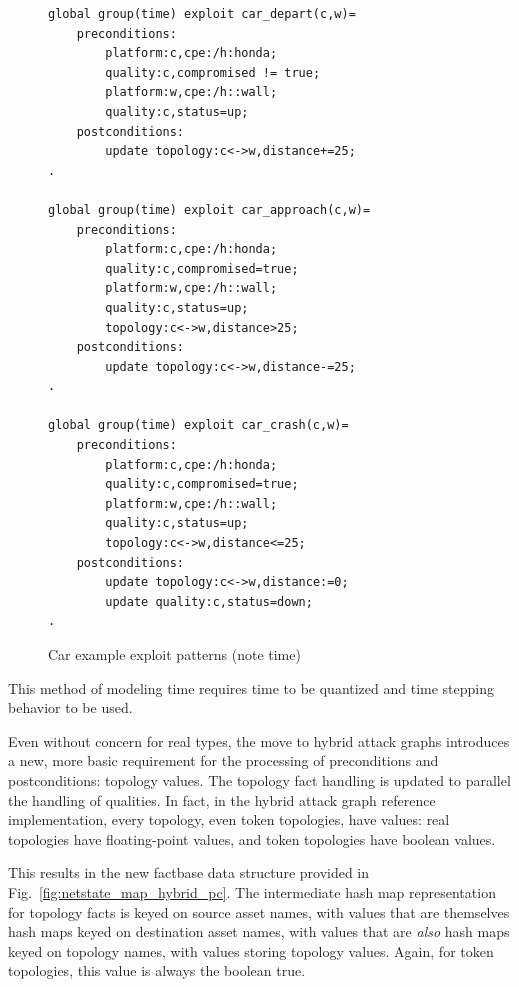 \begin{figure}
\begin{lstlisting}
global group(time) exploit car_depart(c,w)=
    preconditions:
        platform:c,cpe:/h:honda;
        quality:c,compromised != true;
        platform:w,cpe:/h::wall;
        quality:c,status=up;
    postconditions:
        update topology:c<->w,distance+=25;
.

global group(time) exploit car_approach(c,w)=
    preconditions:
        platform:c,cpe:/h:honda;
        quality:c,compromised=true;
        platform:w,cpe:/h::wall;
        quality:c,status=up;
        topology:c<->w,distance>25;
    postconditions:
        update topology:c<->w,distance-=25;
.

global group(time) exploit car_crash(c,w)=
    preconditions:
        platform:c,cpe:/h:honda;
        quality:c,compromised=true;
        platform:w,cpe:/h::wall;
        quality:c,status=up;
        topology:c<->w,distance<=25;
    postconditions:
        update topology:c<->w,distance:=0;
        update quality:c,status=down;
.
\end{lstlisting}
\caption{Car example exploit patterns (note time)}
\label{fig:illustrative_time_xp}
\end{figure}

This method of modeling time requires time to be quantized and time stepping
behavior to be used. 

Even without concern for real types, the move to hybrid attack graphs 
introduces a new, more basic requirement for the processing of preconditions
and postconditions: topology values. The topology fact handling is updated
to parallel the handling of qualities. In fact, in the hybrid attack graph
reference implementation, every topology, even token topologies, have values:
real topologies have floating-point values, and token topologies have boolean
values.

This results in the new factbase data structure provided in 
Fig.~\ref{fig:netstate_map_hybrid_pc}. The intermediate hash map representation
for topology facts is keyed on source asset names, with values that are
themselves hash maps keyed on destination asset names, with values that are
\emph{also} hash maps keyed on topology names, with values storing topology
values. Again, for token topologies, this value is always the boolean true.

